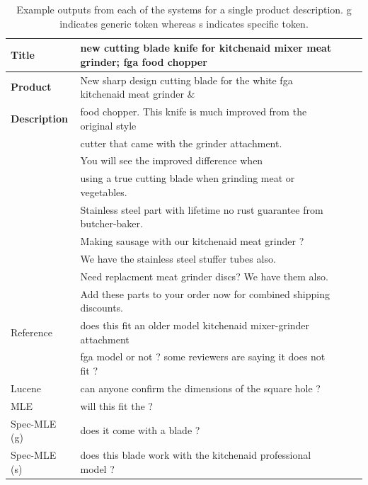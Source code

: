 \documentclass[11pt,a4paper]{article}
\begin{document}
\begin{table}[t]
\begin{tabular}{l l c c}
 \toprule
  \textbf{Title} & new cutting blade knife for kitchenaid mixer meat grinder; fga food chopper    \\
\midrule
\textbf{Product} &  New sharp design cutting blade for the white fga kitchenaid meat grinder \& \\
\textbf{Description} &  food chopper. This knife is much improved from the original style \\
 &cutter that came with the grinder attachment. \\
 &You will see the improved difference when \\
& using a true cutting blade when grinding meat or vegetables.  \\
& Stainless steel part with lifetime no rust guarantee from butcher-baker. \\
& Making sausage with our kitchenaid meat grinder ? \\
& We have the stainless steel stuffer tubes also. \\
& Need replacment meat grinder discs? We have them also. \\
&  Add these parts to your order now for combined shipping discounts. \\
\midrule
Reference & does this fit an older model kitchenaid mixer-grinder attachment \\
& fga model or not ? some reviewers are saying it does not fit ?\\
Lucene & can anyone confirm the dimensions of the square hole ? \\
MLE & will this fit the ?\\
Spec-MLE (g) & does it come with a blade ? \\
Spec-MLE (s) & does this blade work with the kitchenaid professional model ?\\
\bottomrule

\end{tabular}
\caption{Example outputs from each of the systems for a single product description. g indicates generic token whereas s indicates specific token.}\label{tab:spec-example-outputs}
\end{table}




%
%
\end{document}
